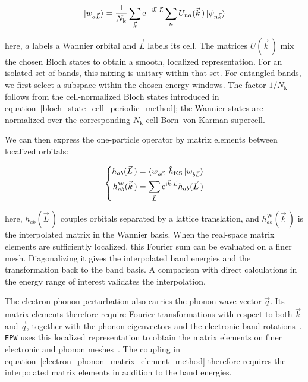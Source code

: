\begin{equation}
    \ket{w_{a\vec{L}}}
    =\frac{1}{N_\mathrm{k}}\sum_{\vec{k}}
    \mathrm{e}^{-\mathrm{i}\vec{k}\cdot\vec{L}}
    \sum_n U_{na}(\vec{k}\,)\ket{\psi_{n\vec{k}}}
\label{wannier_transformation_method}
\end{equation}

here, $a$ labels a Wannier orbital and $\vec{L}$ labels its cell.
The matrices $U(\vec{k}\,)$ mix the chosen Bloch states to obtain a smooth, localized representation.
For an isolated set of bands, this mixing is unitary within that set.
For entangled bands, we first select a subspace within the chosen energy windows.
The factor $1/N_\mathrm{k}$ follows from the cell-normalized Bloch states introduced in equation~\eqref{bloch_state_cell_periodic_method};
the Wannier states are normalized over the corresponding $N_\mathrm{k}$-cell Born--von Karman supercell.

We can then express the one-particle operator by matrix elements between localized orbitals:

\begin{equation}
\left\{\begin{aligned}
    h_{ab}(\vec{L}\,)
    &=\bra{w_{a\vec{0}}}\hat{h}_\mathrm{KS}\ket{w_{b\vec{L}}} \\
    h_{ab}^{\mathrm{W}}(\vec{k}\,)
    &=\sum_{\vec{L}}\mathrm{e}^{\mathrm{i}\vec{k}\cdot\vec{L}}h_{ab}(\vec{L}\,)
\end{aligned}\right.
\label{wannier_hamiltonian_interpolation_method}
\end{equation}

here, $h_{ab}(\vec{L}\,)$ couples orbitals separated by a lattice translation,
and $h_{ab}^{\mathrm{W}}(\vec{k}\,)$ is the interpolated matrix in the Wannier basis.
When the real-space matrix elements are sufficiently localized,
this Fourier sum can be evaluated on a finer mesh.
Diagonalizing it gives the interpolated band energies and the transformation back to the band basis.
A comparison with direct calculations in the energy range of interest validates the interpolation.

The electron-phonon perturbation also carries the phonon wave vector $\vec{q}$.
Its matrix elements therefore require Fourier transformations with respect to both $\vec{k}$ and $\vec{q}$,
together with the phonon eigenvectors and the electronic band rotations~\cite{giustino2007electron,verdi2015frohlich}.
\texttt{EPW} uses this localized representation to obtain the matrix elements on finer electronic and phonon meshes~\cite{ponce2016epw}.
The coupling in equation~\eqref{electron_phonon_matrix_element_method} therefore requires the interpolated matrix elements in addition to the band energies.

